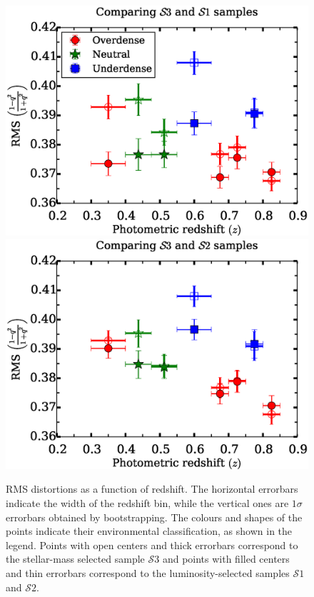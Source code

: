 \documentclass[twocolumn,useAMS,usenatbib]{mn2e}
\newcommand{\s}{\ensuremath{\mathcal{S}}}
\begin{document}
\begin{figure}
 \centering
 \includegraphics[width=1.0\columnwidth]{rms_ellip2_noevolution.eps} \\
 \includegraphics[width=1.0\columnwidth]{rms_ellip2_Bbandevolution.eps} \\
 \caption{RMS distortions as a function of redshift. The horizontal errorbars indicate
          the width of the redshift bin, while the vertical ones
          are $1\sigma$ errorbars obtained by
          bootstrapping. The colours and shapes of the points indicate their
          environmental classification, as shown in the legend. Points with open centers and thick errorbars correspond to the stellar-mass selected sample \s$3$
          and points with filled centers and thin errorbars correspond to the luminosity-selected samples \s$1$ and \s$2$.             
          }
 \label{fig:rms_ellip}
\end{figure}
\end{document}
